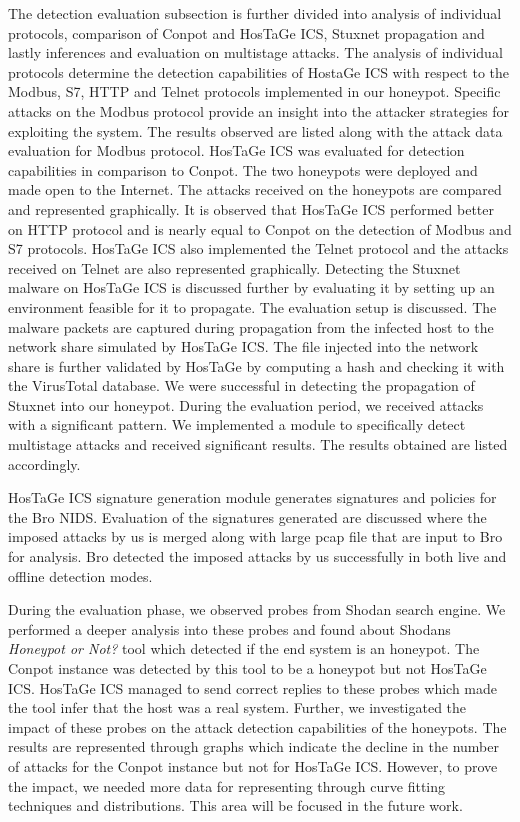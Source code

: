 \documentclass[article,msc=informatik,type=msc,colorback,accentcolor=tud9c]{tudthesis}
\begin{document}
	
	\vspace{3mm}
	The detection evaluation subsection is further divided into analysis of individual protocols, comparison of Conpot and HosTaGe ICS, Stuxnet propagation and lastly inferences and evaluation on multistage attacks.
	The analysis of individual protocols determine the detection capabilities of HostaGe ICS with respect to the Modbus, S7, HTTP and Telnet protocols implemented in our honeypot. Specific attacks on the Modbus protocol provide 	an insight into the attacker strategies for exploiting the system. The results observed are listed along with the attack data evaluation for Modbus protocol. HosTaGe ICS was evaluated for detection capabilities in comparison to Conpot. The two honeypots were deployed and made open to the Internet. The attacks received on the honeypots are compared and represented graphically. It is observed that HosTaGe ICS performed better on HTTP protocol and is nearly equal to Conpot on the detection of Modbus and S7 protocols. HosTaGe ICS also implemented the Telnet protocol and the attacks received on Telnet are also represented graphically. Detecting the Stuxnet malware on HosTaGe ICS is discussed further by evaluating it by setting up an environment feasible for it to propagate. The evaluation setup is discussed. The malware packets are captured during propagation from the infected host to the network share simulated by HosTaGe ICS. The file injected into the network share is further validated by HosTaGe by computing a hash and checking it with the VirusTotal database. We were successful in detecting the propagation of Stuxnet into our honeypot. During the evaluation period, we received attacks with a significant pattern. We implemented a module to specifically detect multistage attacks and received significant results. The results obtained are listed accordingly. 


	\vspace{3mm}
	HosTaGe ICS signature generation module generates signatures and policies for the Bro \ac{NIDS}. Evaluation of the signatures generated are discussed where the imposed attacks by us is merged along with large pcap file that are input to Bro for analysis. Bro detected the imposed attacks by us successfully in both live and offline detection modes. 
	
	\vspace{3mm}
	During the evaluation phase, we observed probes from Shodan search engine. We performed a deeper analysis into these probes and found about Shodans \textit{Honeypot or Not?} tool which detected if the end system is an honeypot. The Conpot instance was detected by this tool to be a honeypot but not HosTaGe ICS. HosTaGe ICS managed to send correct replies to these probes which made the tool infer that the host was a real system. Further, we investigated the impact of these probes on the attack detection capabilities of the honeypots. The results are represented through graphs which indicate the decline in the number of attacks for the Conpot instance but not for HosTaGe ICS. However, to prove the impact, we needed more data for representing through curve fitting techniques and distributions. This area will be focused in the future work.
	
\end{document}
